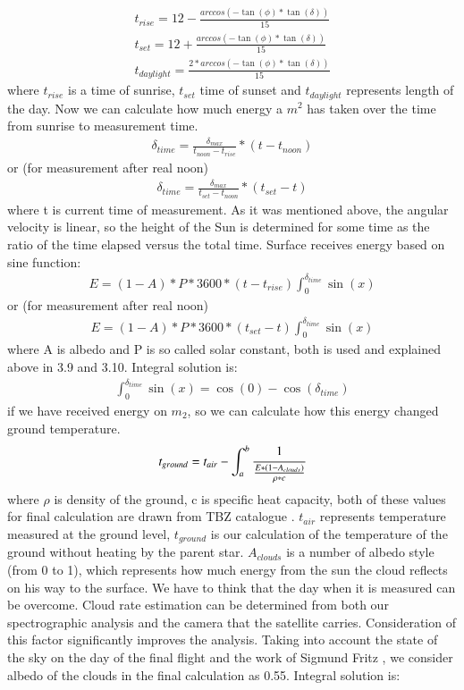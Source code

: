 \documentclass{cfp}
\begin{document}
\begin{align}
t_{rise} = 12 - \frac{arccos(-\tan(\phi)*\tan(\delta))}{15} \\
t_{set} = 12 + \frac{arccos(-\tan(\phi)*\tan(\delta))}{15}\\
t_{daylight} = \frac{2*arccos(-\tan(\phi)*\tan(\delta))}{15}
\end{align}
where $t_{rise}$ is a time of sunrise, $t_{set}$ time of sunset and $t_{daylight}$ represents length of the day. 
Now we can calculate how much energy a $m^2$ has taken over the time from sunrise to measurement time.
\begin{align}
\delta_{time} =\frac{\delta_{max}}{t_{noon}-t_{rise}}*(t-t_{noon})
\end{align}
or (for measurement after real noon)
\begin{align}
\delta_{time} =\frac{\delta_{max}}{t_{set}-t_{noon}}*(t_{set}-t)
\end{align}
where t is current time of measurement. As it was mentioned above, the angular velocity is linear, so the height of the Sun is determined for some time as the ratio of the time elapsed versus the total time. Surface receives energy based on sine function:
\begin{align}
E =(1-A)*P*3600*(t-t_{rise}) \int_{0}^{\delta_{time}} \sin(x)
\end{align}
or (for measurement after real noon)
\begin{align}
E =(1-A)*P*3600*(t_{set}-t) \int_{0}^{\delta_{time}} \sin(x)
\end{align}
where A is albedo and P is so called solar constant, both is used and explained above in 3.9 and 3.10. Integral solution is: 
\begin{align}
\int_{0}^{\delta_{time}} \sin(x) = \cos(0) - \cos(\delta_{time})
\end{align}
if we have received energy on $m_2$, so we can calculate how this energy changed ground temperature.
\begin{align}
t_{ground} =t_{air} - \int_{a}^{b} \cfrac{1}{\frac{E*(1-A_{clouds})}{\rho*c}}
\end{align}
where $\rho$ is density of the ground, c is specific heat capacity, both of these values for final calculation are drawn from TBZ catalogue \cite{TBZ}. $t_{air}$ represents temperature measured at the ground level, $t_{ground}$ is our calculation of the temperature of the ground without heating by the parent star. $A_{clouds}$ is a number of albedo style (from 0 to 1), which represents how much energy from the sun the cloud reflects on his way to the surface. We have to think that the day when it is measured can be overcome. Cloud rate estimation can be determined from both our spectrographic analysis and the camera that the satellite carries. Consideration of this factor significantly improves the analysis. Taking into account the state of the sky on the day of the final flight and the work of Sigmund Fritz \cite{Fritz}, we consider albedo of the clouds in the final calculation as 0.55. Integral solution is:
\end{document}
